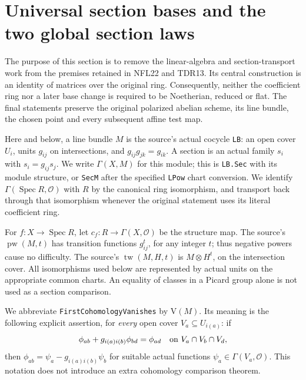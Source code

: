 \section{Universal section bases and the two global section laws}
\label{sec:global-section-laws-v052}


The purpose of this section is to remove the linear-algebra and
section-transport work from the premises retained in NFL22 and TDR13.
Its central construction is an identity of matrices over the original
ring.  Consequently, neither the coefficient ring nor a later base
change is required to be Noetherian, reduced or flat.  The final
statements preserve the original polarized abelian scheme, its line
bundle, the chosen point and every subsequent affine test map.

Here and below, a line bundle $M$ is the source's actual cocycle
\texttt{LB}: an open cover $U_i$, units $g_{ij}$ on intersections,
and $g_{ij}g_{jk}=g_{ik}$.  A section is an actual family $s_i$ with
$s_i=g_{ij}s_j$.  We write $\Gamma(X,M)$ for this module; this is
\texttt{LB.Sec} with its module structure, or \texttt{SecM} after
the specified \texttt{LPow} chart conversion.  We identify
$\Gamma(\operatorname{Spec}R,\mathcal O)$ with $R$ by the canonical
ring isomorphism, and transport back through that isomorphism whenever
the original statement uses its literal coefficient ring.

For $f:X\to\operatorname{Spec}R$, let $c_f:R\to\Gamma(X,\mathcal O)$
be the structure map.  The source's $\operatorname{pw}(M,t)$ has
transition functions $g_{ij}^{t}$, for any integer $t$; thus negative
powers cause no difficulty.  The source's
$\operatorname{tw}(M,H,t)$ is $M\otimes H^t$, on the intersection
cover.  All isomorphisms used below are represented by actual units on
the appropriate common charts.  An equality of classes in a Picard group
alone is not used as a section comparison.

We abbreviate \texttt{FirstCohomologyVanishes} by $\mathrm{V}(M)$.
Its meaning is the following explicit assertion, for \emph{every}
open cover $V_a\subseteq U_{i(a)}$: if
\[
 \phi_{ab}+g_{i(a)i(b)}\phi_{bd}=\phi_{ad}
 \quad\hbox{on }V_a\cap V_b\cap V_d,
\]
then $\phi_{ab}=\psi_a-g_{i(a)i(b)}\psi_b$ for suitable actual
functions $\psi_a\in\Gamma(V_a,\mathcal O)$.  This notation does
not introduce an extra cohomology comparison theorem.


